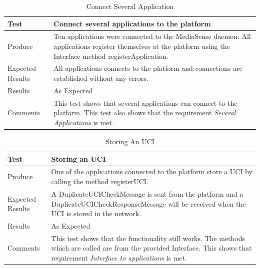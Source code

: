 \begin{table}[!h]
    \begin{tabular}{ | l | p{12cm} |}
    \hline
    Test 	 				& 		 Connect several applications to the platform\\ \hline
	Produce  				& 		 Ten applications were connected to the MediaSense daemon. All applications register themselves at the platform using the Interface method registerApplication.\\ \hline
	Expected Results  		& 		 All applications connects to the platform and connections are established without any errors.\\ \hline
	Results 				& 		 As Expected\\ \hline
	Comments				& 		 This test shows that several applications can connect to the platform. This test also shows that the requirement \emph{Several Applications} is met.\\ \hline
    \end{tabular}
    \caption{Connect Several Application}
\end{table}

\begin{table}[!h]
    \begin{tabular}{ | l | p{12cm} |}
    \hline
    Test 	 				& 		 Storing an UCI\\ \hline
	Produce  				& 		 One of the applications connected to the platform store a UCI by calling the method registerUCI.\\ \hline
	Expected Results  		& 		 A DuplicateUCICheckMessage is sent from the platform and a DuplicateUCICheckResponseMessage will be received when the UCI is stored in the network.\\ \hline
	Results 				& 		 As Expected\\ \hline
	Comments				& 		 This test shows that the functionality still works. The methods which are called are from the provided Interface. This shows that requirement \emph{Interface to applications} is met.\\ \hline
    \end{tabular}
    \caption{Storing An UCI}
\end{table}

